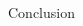 \documentclass[final]{beamer}
\begin{document}
\begin{frame}{}
\begin{columns}[t]
\begin{column}{.49\linewidth}
\begin{block}{Conclusion}
        \end{block}

      \end{column}
    \end{columns}
    

  \end{frame}
\end{document}
